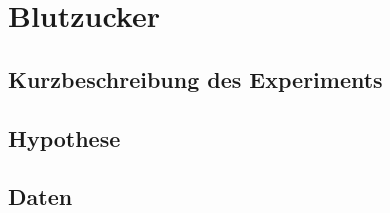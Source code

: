 \section{Blutzucker}

\subsection{Kurzbeschreibung des Experiments}

\subsection{Hypothese}

\subsection{Daten}

\newpage
